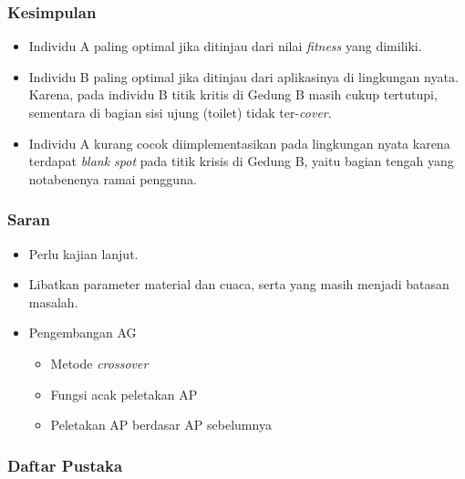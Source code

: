 \documentclass[12pt]{beamer}
\begin{document}
	\begin{frame}
		\frametitle{Kesimpulan}
		\begin{itemize}
			\item Individu A paling optimal jika ditinjau dari nilai \emph{fitness} yang dimiliki.
			\item Individu B paling optimal jika ditinjau dari aplikasinya di lingkungan nyata. Karena, pada individu B titik kritis di Gedung B masih cukup tertutupi, sementara di bagian sisi ujung (toilet) tidak ter-\emph{cover}.
			\item Individu A kurang cocok diimplementasikan pada lingkungan nyata karena terdapat \emph{blank spot} pada titik krisis di Gedung B, yaitu bagian tengah yang notabenenya ramai pengguna.
		\end{itemize}
	\end{frame}
	
	\begin{frame}
		\frametitle{Saran}
		\begin{itemize}
			\item Perlu kajian lanjut.
			\item Libatkan parameter material dan cuaca, serta yang masih menjadi batasan masalah.
			\item Pengembangan AG
				\begin{itemize}
					\item Metode \emph{crossover}
					\item Fungsi acak peletakan AP
					\item Peletakan AP berdasar AP sebelumnya
				\end{itemize}
		\end{itemize}
	\end{frame}
	\begin{frame}
		\frametitle{Daftar Pustaka}
		\nocite{*}
		
		
	\end{frame}
\end{document}
